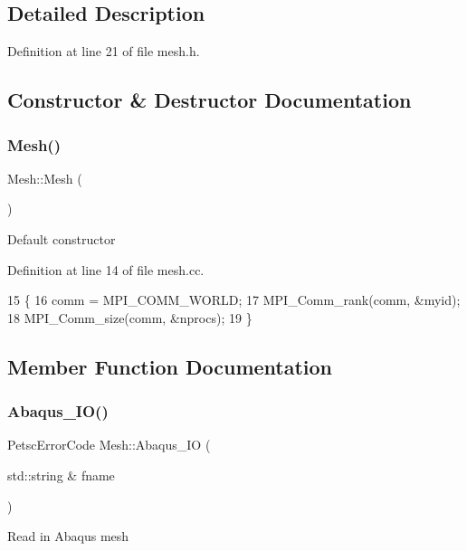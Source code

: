 \subsection{Detailed Description}


Definition at line 21 of file mesh.\+h.



\subsection{Constructor \& Destructor Documentation}
\mbox{\label{class_mesh_a2af137f1571af89172b9c102302c416b}} 
\subsubsection{\texorpdfstring{Mesh()}{Mesh()}}
{\footnotesize\ttfamily Mesh\+::\+Mesh (\begin{DoxyParamCaption}{ }\end{DoxyParamCaption})}

Default constructor 

Definition at line 14 of file mesh.\+cc.


\begin{DoxyCode}
15 \{
16   comm = MPI\_COMM\_WORLD;
17   MPI\_Comm\_rank(comm, &myid);
18   MPI\_Comm\_size(comm, &nprocs);
19 \}
\end{DoxyCode}


\subsection{Member Function Documentation}
\mbox{\label{class_mesh_aa381581e1c9fe95f438d4a66c4291a5f}} 
\subsubsection{\texorpdfstring{Abaqus\+\_\+\+I\+O()}{Abaqus\_IO()}}
{\footnotesize\ttfamily Petsc\+Error\+Code Mesh\+::\+Abaqus\+\_\+\+IO (\begin{DoxyParamCaption}\item[{std\+::string \&}]{fname }\end{DoxyParamCaption})}

Read in Abaqus mesh 


